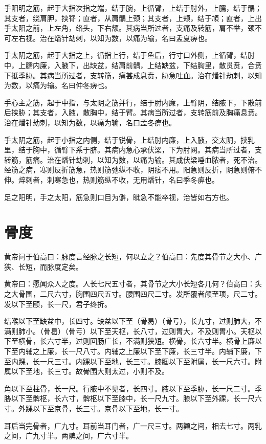 \documentclass[a4paper,12pt,UTF8,twoside]{ctexbook}
\begin{document}
	手阳明之筋，起于大指次指之端，结于腕，上循臂，上结于肘外，上臑，结于髃；其支者，绕肩胛，挟脊；直者，从肩髃上颈；其支者，上颊，结于頄；直者，上出手太阳之前，上左角，络头，下右颔。其病当所过者，支痛及转筋，肩不举，颈不可左右视。治在燔针劫刺，以知为数，以痛为输，名曰孟夏痹也。
	
	手太阴之筋，起于大指之上，循指上行，结于鱼后，行寸口外侧，上循臂，结肘中，上臑内廉，入腋下，出缺盆，结肩前髃，上结缺盆，下结胸里，散贯贲，合贲下抵季胁。其病当所过者，支转筋，痛甚成息贲，胁急吐血。治在燔针劫刺，以知为数，以痛为输。名曰仲冬痹也。
	
	手心主之筋，起于中指，与太阴之筋并行，结于肘内廉，上臂阴，结腋下，下散前后挟胁；其支者，入腋，散胸中，结于臂。其病当所过者，支转筋前及胸痛息贲。治在燔针劫刺，以知为数，以痛为输，名曰孟冬痹也。
	
	手太阴之筋，起于小指之内侧，结于锐骨，上结肘内廉，上入腋，交太阴，挟乳里，结于胸中，循臂下系于脐。其病内急心承伏梁，下为肘网。其病当所过者，支转筋，筋痛。治在燔针劫刺，以知为数，以痛为输。其成伏梁唾血脓者，死不治。经筋之病，寒则反折筋急，热则筋弛纵不收，阴痿不用。阳急则反折，阴急则俯不伸。焠刺者，刺寒急也，热则筋纵不收，无用燔针，名曰季冬痹也。
	
	足之阳明，手之太阳，筋急则口目为僻，眦急不能卒视，治皆如右方也。
	\chapter{骨度}
	
	黄帝问于伯高曰：脉度言经脉之长短，何以立之？伯高曰：先度其骨节之大小、广狭、长短，而脉度定矣。
	
	黄帝曰：愿闻众人之度。人长七尺五寸者，其骨节之大小长短各几何？伯高曰：头之大骨围，二尺六寸，胸围四尺五寸。腰围四尺二寸。发所覆者颅至项，尺二寸。发以下至颐，长一尺，君子终折。
	
	结喉以下至缺盆中，长四寸。缺盆以下至（骨曷）（骨亏），长九寸，过则肺大，不满则肺小。（骨曷）（骨亏）以下至天枢，长八寸，过则胃大，不及则胃小。天枢以下至横骨，长六寸半，过则回肠广长，不满则狭短。横骨，长六寸半。横骨上廉以下至内辅之上廉，长一尺八寸。内辅之上廉以下至下廉，长三寸半。内辅下廉，下至内踝，长一尺三寸。内踝以下至地，长三寸。膝腘以下至附属，长一尺六寸。附属以下至地，长三寸。故骨围大则太过，小则不及。
	
	角以下至柱骨，长一尺。行腋中不见者，长四寸。腋以下至季胁，长一尺二寸。季胁以下至髀枢，长六寸，髀枢以下至膝中，长一尺九寸。膝以下至外踝，长一尺六寸。外踝以下至京骨，长三寸。京骨以下至地，长一寸。
	
	耳后当完骨者，广九寸。耳前当耳门者，广一尺三寸。两颧之间，相去七寸。两乳之间，广九寸半。两髀之间，广六寸半。
	
\end{document}
